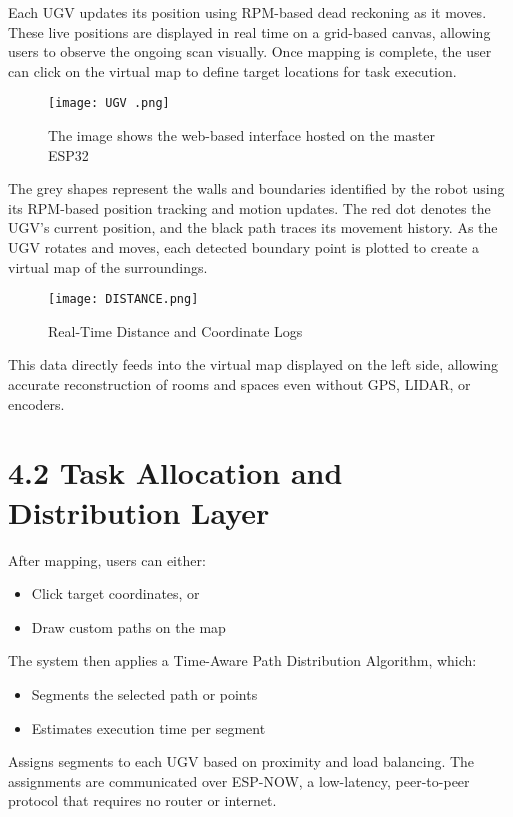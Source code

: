 \documentclass[a4paper,12pt]{report}
\begin{document}
Each UGV updates its position using RPM-based dead reckoning as it moves. These live positions are displayed in real time on a grid-based canvas, allowing users to observe the ongoing scan visually. Once mapping is complete, the user can click on the virtual map to define target locations for task execution.

\begin{figure}[h!]
    \centering
    \texttt{[image: UGV .png]}
    \caption{The image shows the web-based interface hosted on the master ESP32}
    \label{fig:web_interface}
\end{figure}

The grey shapes represent the walls and boundaries identified by the robot using its RPM-based position tracking and motion updates. The red dot denotes the UGV’s current position, and the black path traces its movement history. As the UGV rotates and moves, each detected boundary point is plotted to create a virtual map of the surroundings.

\begin{figure}[h!]
    \centering
    \texttt{[image: DISTANCE.png]}
    \caption{Real-Time Distance and Coordinate Logs}
    \label{fig:distance_log}
\end{figure}

This data directly feeds into the virtual map displayed on the left side, allowing accurate reconstruction of rooms and spaces even without GPS, LIDAR, or encoders.


\section{4.2 Task Allocation and Distribution Layer}

After mapping, users can either:
\begin{itemize}
    \item Click target coordinates, or
    \item Draw custom paths on the map
\end{itemize}

The system then applies a Time-Aware Path Distribution Algorithm, which:
\begin{itemize}
    \item Segments the selected path or points
    \item Estimates execution time per segment
\end{itemize}

Assigns segments to each UGV based on proximity and load balancing.  
The assignments are communicated over ESP-NOW, a low-latency, peer-to-peer protocol that requires no router or internet.
\end{document}
